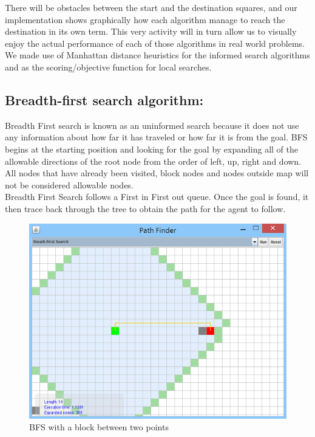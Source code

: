 \documentclass[a4paper]{article}
\begin{document}
There will be obstacles between the start and the destination squares, and our implementation shows graphically how each algorithm manage to reach the destination in its own term. This very activity will in turn allow us to visually enjoy the actual performance of each of those algorithms in real world problems. We made use of Manhattan distance heuristics for the informed search algorithms and as the scoring/objective function for local searches.


\subsection{Breadth-first search algorithm:}

Breadth First search is known as an uninformed search because it does not use any information about how far it has traveled or how far it is from the goal. BFS begins at the starting position and looking for the goal by expanding all of the allowable directions of the root node from the order of left, up, right and down. All nodes that have already been visited, block nodes and nodes outside map will not be considered allowable nodes. \\

Breadth First Search follows a First in First out queue. Once the goal is found, it then trace back through the tree to obtain the path for the agent to follow. \\

\begin{figure}[h!]
  \centering
    \includegraphics[scale=.9]{images/bfs1.png}
  \caption{BFS with a block between two points}
\end{figure}
\end{document}
